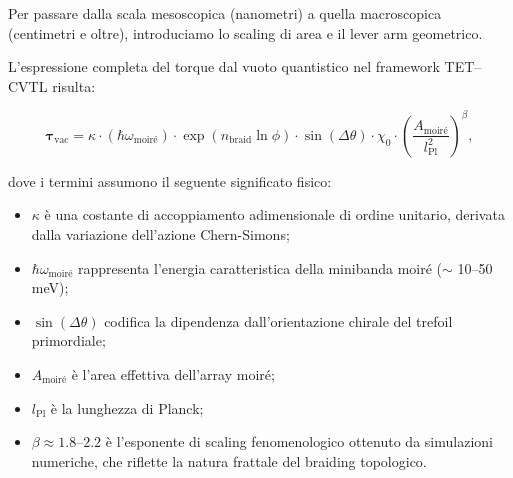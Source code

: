 \documentclass[11pt,a4paper]{article}
\theoremstyle{plain}
\theoremstyle{definition}
\begin{document}
Per passare dalla scala mesoscopica (nanometri) a quella macroscopica (centimetri e oltre), introduciamo lo scaling di area e il lever arm geometrico. 

\vspace{0.4cm}


\begin{tcolorbox}[
    colback=blue!8!white,
    colframe=emerald!70!blue,
    coltitle=white,
    fonttitle=\bfseries,
    title=Espressione Completa del Chiral Vacuum Torque,
    sharp corners,
    boxrule=0.9pt,
    enhanced,
    attach boxed title to top left={xshift=12pt, yshift=-3mm},
    boxed title style={colback=emerald!70!blue}
]

L'espressione completa del torque dal vuoto quantistico nel framework TET–CVTL risulta:

\begin{equation}
\boldsymbol{\tau}_{\text{vac}} = \kappa \cdot (\hbar \omega_{\text{moiré}}) \cdot \exp\left(n_{\text{braid}} \ln\phi\right) \cdot \sin(\Delta\theta) \cdot \chi_0 \cdot \left( \frac{A_{\text{moiré}}}{l_{\text{Pl}}^2} \right)^\beta,
\label{eq:tau_vac_full}
\end{equation}

\end{tcolorbox}

\vspace{0.2cm}



dove i termini assumono il seguente significato fisico:

\begin{itemize}
    \item \(\kappa\) è una costante di accoppiamento adimensionale di ordine unitario, derivata dalla variazione dell'azione Chern-Simons;
    \item \(\hbar \omega_{\text{moiré}}\) rappresenta l'energia caratteristica della minibanda moiré (\(\sim\) 10–50\,meV);
    \item \(\sin(\Delta\theta)\) codifica la dipendenza dall'orientazione chirale del trefoil primordiale;
    \item \(A_{\text{moiré}}\) è l'area effettiva dell'array moiré;
    \item \(l_{\text{Pl}}\) è la lunghezza di Planck;
    \item \(\beta \approx 1.8\)–\(2.2\) è l'esponente di scaling fenomenologico ottenuto da simulazioni numeriche, che riflette la natura frattale del braiding topologico.
\end{itemize}
\end{document}
